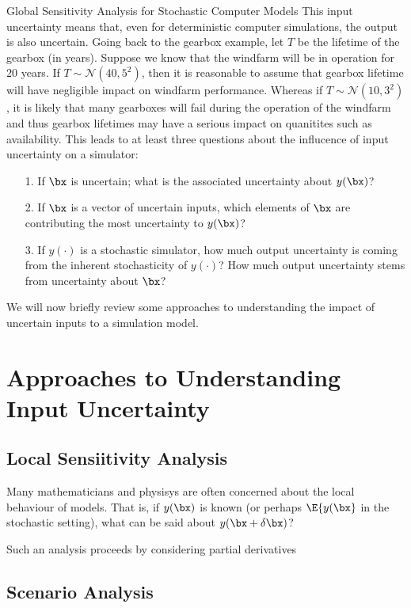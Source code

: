 \begin{chapter}{Global Sensitivity Analysis for Stochastic Computer Models}
This input uncertainty means that, even for deterministic computer simulations, the output is also uncertain. Going back to the gearbox example, let $T$ be the lifetime of the gearbox (in years). Suppose we know that the windfarm will be in operation for $20$ years. If $T \sim \mathcal{N}(40, 5^2)$, then it is reasonable to assume that gearbox lifetime will have negligible impact on windfarm performance. Whereas if $T \sim \mathcal{N}(10, 3^2)$, it is likely that many gearboxes will fail during the operation of the windfarm and thus gearbox lifetimes may have a serious impact on quanitites such as availability. This leads to at least three questions about the influcence of input uncertainty on a simulator:
\begin{itemize}
    \item[1.] If $\bx$ is uncertain; what is the associated uncertainty about $y(\bx)$?
    \item[2.] If $\bx$ is a vector of uncertain inputs, which elements of $\bx$ are contributing the most uncertainty to $y(\bx)$?
    \item[3.] If $y(\cdot)$ is a stochastic simulator, how much output uncertainty is coming from the inherent stochasticity of $y(\cdot)$? How much output uncertainty stems from uncertainty about $\bx$?
\end{itemize}

We will now briefly review some approaches to understanding the impact of uncertain inputs to a simulation model.

\section{Approaches to Understanding Input Uncertainty}

\subsection{Local Sensiitivity Analysis}

Many mathematicians and physisys are often concerned about the local behaviour of models. That is, if $y(\bx)$ is known (or perhaps $\E \{ y(\bx \} $ in the stochastic setting), what can be said about $y(\bx + \delta \bx)$?

Such an analysis proceeds by considering partial derivatives

\subsection{Scenario Analysis}


\end{chapter}
